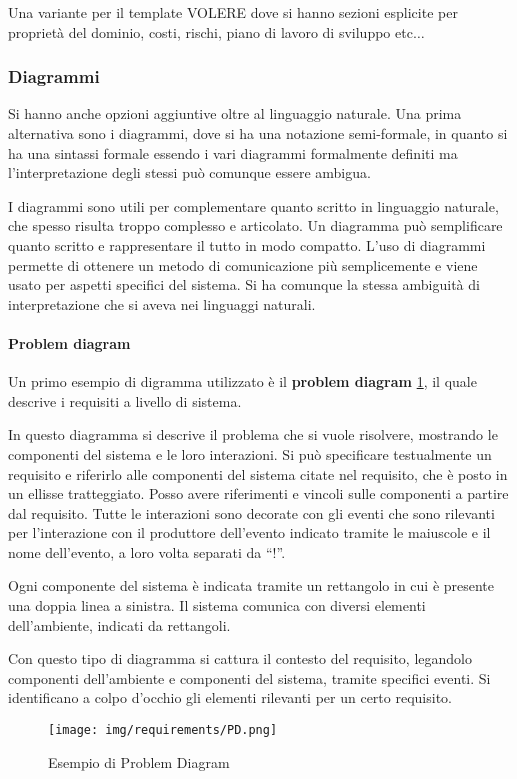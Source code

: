 Una variante per il template VOLERE dove si hanno sezioni esplicite per proprietà
del dominio, costi, rischi, piano di lavoro di sviluppo etc$\dots$
\subsubsection{Diagrammi}
Si hanno anche opzioni aggiuntive oltre al linguaggio naturale. Una prima alternativa
sono i diagrammi, dove si ha una notazione semi-formale, in quanto si ha una sintassi
formale essendo i vari diagrammi formalmente definiti ma l'interpretazione degli
stessi può comunque essere ambigua.

I diagrammi sono utili per complementare quanto scritto in linguaggio naturale, che
spesso risulta troppo complesso e articolato. Un diagramma può semplificare quanto
scritto e rappresentare il tutto in modo compatto. L'uso di diagrammi permette
di ottenere un metodo di comunicazione più semplicemente e viene usato per aspetti
specifici del sistema. Si ha comunque la stessa ambiguità di interpretazione
che si aveva nei linguaggi naturali.
\paragraph{Problem diagram}
Un primo esempio di digramma utilizzato è il \textbf{problem diagram}
\ref{fig:problemDiagram}, il quale
descrive i requisiti a livello di sistema.

In questo diagramma si descrive il problema che si vuole risolvere, mostrando le
componenti del sistema e le loro interazioni. Si può specificare testualmente un
requisito e riferirlo alle componenti del sistema citate nel requisito, che è
posto in un ellisse tratteggiato. Posso avere riferimenti e vincoli sulle
componenti a partire dal requisito. Tutte le interazioni sono decorate con gli
eventi che sono rilevanti per l'interazione con il produttore dell'evento indicato
tramite le maiuscole e il nome dell'evento, a loro volta separati da “!”.

Ogni componente del sistema è indicata tramite un rettangolo in cui è presente
una doppia linea a sinistra. Il sistema comunica con diversi elementi dell'ambiente,
indicati da rettangoli.

Con questo tipo di diagramma si cattura il contesto del requisito, legandolo
componenti dell'ambiente e componenti del sistema, tramite specifici eventi.
Si identificano a colpo d'occhio gli elementi rilevanti per un certo requisito.
\begin{figure}[!ht]
    \centering
    \texttt{[image: img/requirements/PD.png]}
    \caption{Esempio di Problem Diagram}
    \label{fig:problemDiagram}
\end{figure}


